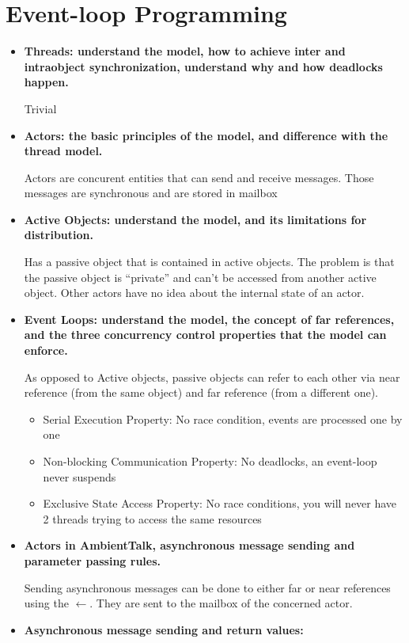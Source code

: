 \documentclass[a4paper]{report}
\begin{document}
\chapter{Event-loop Programming}
\begin{itemize}
  \item\textbf{ Threads: understand the model, how to achieve inter and intraobject synchronization,  understand why and how deadlocks happen.}

  Trivial
  \item\textbf{ Actors: the basic principles of the model, and difference with the thread model.}

  Actors are concurent entities that can send and receive messages. Those messages are synchronous and are stored in mailbox
  \item\textbf{ Active Objects: understand the model, and its limitations for distribution.}

  Has a passive object that is contained in active objects. The problem is that the passive object is ``private'' and can't be accessed from another active object. Other actors have no idea about the internal state of an actor.
  \item\textbf{ Event Loops: understand the model, the concept of far references, and the three concurrency control properties that the model can enforce.}

  As opposed to Active objects, passive objects can refer to each other via near reference (from the same object) and far reference (from a different one).
  \begin{itemize}
    \item Serial Execution Property: No race condition, events are processed one by one
    \item Non-blocking Communication Property: No deadlocks, an event-loop never suspends 
    \item Exclusive State Access Property: No race conditions, you will never have 2 threads trying to access the same resources
  \end{itemize}
  \item\textbf{ Actors in AmbientTalk, asynchronous message sending and parameter passing rules.}

  Sending asynchronous messages can be done to either far or near references using the $\leftarrow$. They are sent to the mailbox of the concerned actor. 
  \item\textbf{ Asynchronous message sending and return values:}


\end{itemize}
\end{document}
